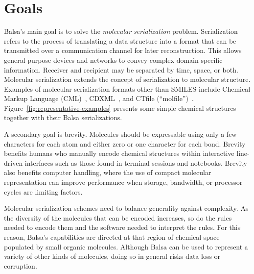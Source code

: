 \documentclass{article}
\begin{document}
\section*{Goals}

Balsa's main goal is to solve the \textit{molecular serialization} problem. Serialization refers to the process of translating a data structure into a format that can be transmitted over a communication channel for later reconstruction. This allows general-purpose devices and networks to convey complex domain-specific information. Receiver and recipient may be separated by time, space, or both. Molecular serialization extends the concept of serialization to molecular structure. Examples of molecular serialization formats other than SMILES include Chemical Markup Language (CML)~\cite{murray-rust:2011}, CDXML~\cite{cdxml}, and CTfile (\enquote{molfile})~\cite{ctfileFormats}. Figure~\ref{fig:representative-examples} presents some simple chemical structures together with their Balsa serializations.

A secondary goal is brevity. Molecules should be expressable using only a few characters for each atom and either zero or one character for each bond. Brevity benefits humans who manually encode chemical structures within interactive line-driven interfaces such as those found in terminal sessions and notebooks. Brevity also benefits computer handling, where the use of compact molecular representation can improve performance when storage, bandwidth, or processor cycles are limiting factors.

Molecular serialization schemes need to balance generality against complexity. As the diversity of the molecules that can be encoded increases, so do the rules needed to encode them and the software needed to interpret the rules. For this reason, Balsa's capabilities are directed at that region of chemical space populated by small organic molecules. Although Balsa can be used to represent a variety of other kinds of molecules, doing so in general risks data loss or corruption.
\end{document}
